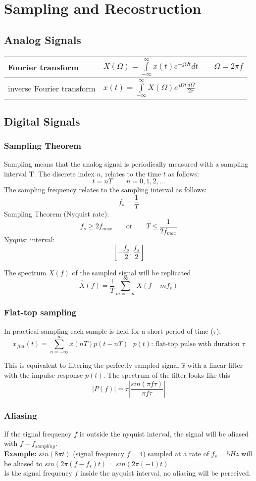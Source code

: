 \section{Sampling and Recostruction}
\subsection{Analog Signals}
\begin{tabularx}{\linewidth}{|l|X|}
	\hline
	Fourier transform & $X(\Omega) = \int\limits_{-\infty}^{\infty} x(t)e^{-j\Omega t}dt \qquad \Omega = 2\pi f $ \\
	\hline
	inverse Fourier transform & $ x(t) = \int\limits_{-\infty}^{\infty} X(\Omega)e^{j\Omega t} \frac{d\Omega}{2 \pi} $ \\
	\hline
\end{tabularx}

\subsection{Digital Signals}
\subsubsection{Sampling Theorem}
Sampling means that the analog signal is periodically measured with a sampling interval T. The discrete index $n$, relates to
the time $t$ as follows:
\[ t = nT \qquad n = 0,1,2,\ldots \]
The sampling frequency relates to the sampling interval as follows:
\[ f_s = \frac{1}{T} \]
Sampling Theorem (Nyquist rate):
\[ f_s \geq 2f_{max} \qquad \text{or} \qquad T \leq \frac{1}{2f_{max}} \]
Nyquist interval:
\[ \left[-\frac{f_s}{2}, \frac{f_s}{2}\right] \]

The spectrum $X(f)$ of the sampled signal will be replicated
\[ \hat{X}(f) = \frac{1}{T} \sum_{m=-\infty}^{\infty}X(f-m f_s)\]


\subsubsection{Flat-top sampling}
In practical sampling each sample is held for a short period of time ($\tau$).
\[ x_{flat}(t) =  \sum_{n=-\infty}^{\infty}x(nT)p(t - nT) ~~~ p(t) \text{: flat-top pulse with duration } \tau \]

This is equivalent to filtering the perfectly sampled signal $\hat{x}$ with a linear filter with the impulse response $p(t)$.
The spectrum of the filter looks like this
\[ |P(f)| = \tau \left| \frac{sin(\pi f \tau)}{\pi f \tau} \right| \]


\subsubsection{Aliasing}
If the signal frequency $f$ is outside the nyquist interval, the signal will be
aliased with $f - f_{sampling}$.\\
\textbf{Example:} $sin(8\pi t)$ (signal frequency $f=4$) sampled at a rate of
$f_s=5Hz$ will be aliased to $sin(2\pi (f-f_s) t) = sin(2\pi (-1) t)$\\

Is the signal frequency $f$ inside the nyquist interval, no aliasing will be
perceived.
